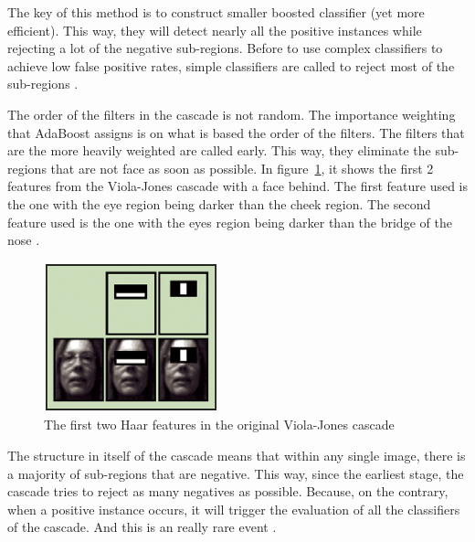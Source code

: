 \noindent The key of this method is to construct smaller boosted classifier (yet more efficient). This way, they will detect nearly all the positive instances while rejecting a lot of the negative sub-regions. Before to use complex classifiers to achieve low false positive rates, simple classifiers are called to reject most of the sub-regions \cite{VIO01}.
\newline

\noindent The order of the filters in the cascade is not random. The importance weighting that AdaBoost assigns is on what is based the order of the filters. The filters that are the more heavily weighted are called early. This way, they eliminate the sub-regions that are not face as soon as possible. In figure~\ref{haar_feature_first_2_features}, it shows the first 2 features from the Viola-Jones cascade with a face behind. The first feature used is the one with the eye region being darker than the cheek region. The second feature used is the one with the eyes region being darker than the bridge of the nose \cite{HEW07}.
\newline

\begin{figure}[!h]
\begin{center}
\noindent \includegraphics[scale=1]{figures/haar_feature_first_2_features} 
\newline
\caption{The first two Haar features in the original Viola-Jones cascade}
\label{haar_feature_first_2_features}
\end{center} 
\end{figure}

\noindent The structure in itself of the cascade means that within any single image, there is a majority of sub-regions that are negative. This way, since the earliest stage, the cascade tries to reject as many negatives as possible. Because, on the contrary, when a positive instance occurs, it will trigger the evaluation of all the classifiers of the cascade. And this is an really rare event \cite{VIO01}.
\newline

